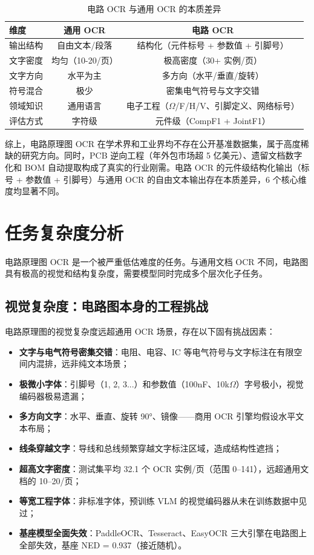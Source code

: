 \begin{table}[h]
\centering
\caption{电路 OCR 与通用 OCR 的本质差异}
\begin{tabular}{lcc}
\toprule
\textbf{维度} & \textbf{通用 OCR} & \textbf{电路 OCR} \\
\midrule
输出结构   & 自由文本/段落   & 结构化（元件标号 + 参数值 + 引脚号） \\
文字密度   & 均匀（10-20/页） & 极高密度（30+ 实例/页） \\
文字方向   & 水平为主         & 多方向（水平/垂直/旋转） \\
符号混合   & 极少             & 密集电气符号与文字交错 \\
领域知识   & 通用语言         & 电子工程（$\Omega$/F/H/V、引脚定义、网络标号） \\
评估方式   & 字符级           & 元件级（CompF1 + JointF1） \\
\bottomrule
\end{tabular}
\end{table}

综上，电路原理图 OCR 在学术界和工业界均不存在公开基准数据集，属于高度稀缺的研究方向。同时，PCB 逆向工程（年外包市场超 5 亿美元）、遗留文档数字化和 BOM 自动提取构成了真实的行业刚需。电路 OCR 的元件级结构化输出（标号 + 参数值 + 引脚号）与通用 OCR 的自由文本输出存在本质差异，6 个核心维度均显著不同。

\section{任务复杂度分析}

电路原理图 OCR 是一个被严重低估难度的任务。与通用文档 OCR 不同，电路图具有极高的视觉和结构复杂度，需要模型同时完成多个层次化子任务。

\subsection{视觉复杂度：电路图本身的工程挑战}

电路原理图的视觉复杂度远超通用 OCR 场景，存在以下固有挑战因素：

\begin{itemize}[nosep]
    \item \textbf{文字与电气符号密集交错}：电阻、电容、IC 等电气符号与文字标注在有限空间内混排，远非纯文本场景；
    \item \textbf{极微小字体}：引脚号（1, 2, 3...）和参数值（100nF、10k$\Omega$）字号极小，视觉编码器极易遗漏；
    \item \textbf{多方向文字}：水平、垂直、旋转 90°、镜像——商用 OCR 引擎均假设水平文本布局；
    \item \textbf{线条穿越文字}：导线和总线频繁穿越文字标注区域，造成结构性遮挡；
    \item \textbf{超高文字密度}：测试集平均 32.1 个 OCR 实例/页（范围 0--141），远超通用文档的 10--20/页；
    \item \textbf{等宽工程字体}：非标准字体，预训练 VLM 的视觉编码器从未在训练数据中见过；
    \item \textbf{基座模型全面失效}：PaddleOCR、Tesseract、EasyOCR 三大引擎在电路图上全部失效，基座 NED = 0.937（接近随机）。
\end{itemize}

